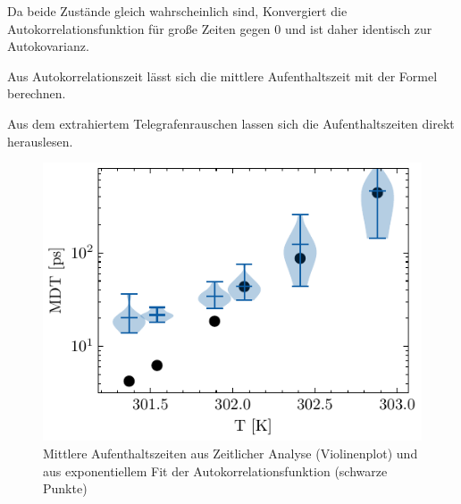 \documentclass[main.tex]{subfiles}
\begin{document}
Da beide Zustände gleich wahrscheinlich sind, Konvergiert die Autokorrelationsfunktion für große Zeiten gegen 0 und ist daher identisch zur Autokovarianz. 


Aus Autokorrelationszeit lässt sich die mittlere Aufenthaltszeit mit der Formel  berechnen.

Aus dem extrahiertem Telegrafenrauschen lassen sich die Aufenthaltszeiten direkt herauslesen. 

\begin{figure}[H]
    \centering
    \includegraphics{bilder/plots/temp_comparison/mean_dwell_time_comparison.pdf}
    \caption{Mittlere Aufenthaltszeiten aus Zeitlicher Analyse (Violinenplot) und aus exponentiellem Fit der Autokorrelationsfunktion (schwarze Punkte)}\label{fig:temp-mdt-comp}
\end{figure}

\end{document}
